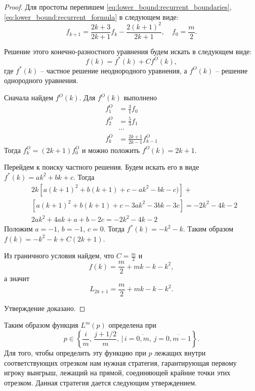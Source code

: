 \begin{proof}
Для простоты перепишем \eqref{eq:lower_bound:recurrent_boundaries}, \eqref{eq:lower_bound:recurrent_formula} в следующем виде:
\begin{equation}
\label{eq:lower_bound:recurrent_formula_simplified}
f_{k+1} = \frac{2k+3}{2k+1} f_k - \frac{2(k+1)^2}{2k+1}, \quad f_0 = \frac{m}{2}.
\end{equation}

Решение этого конечно-разностного уравнения будем искать в следующем виде:
\[
f(k) = f^*(k) + Cf^O(k),
\]
где $ f^*(k) $ -- частное решение неоднородного уравнения, а $ f^O(k) $ -- решение однородного уравнения.

Сначала найдем $ f^O(k) $. Для $ f^O(k) $ выполнено
\begin{align*}
    f^O_1 &= \frac{3}{1} f_0 \\
    f^O_2 &= \frac{5}{3} f_1 \\
    &\cdots \\
    f^O_{k} &= \frac{2k+1}{2k-1} f^O_{k-1}
\end{align*}
Тогда $ f^O_k = (2k+1)f^O_0 $ и можно положить $ f^O(k) = 2k + 1 $. 

Перейдем к поиску частного решения. Будем искать его в виде $ f^*(k) = ak^2 + bk + c $. Тогда
\begin{align*}
    &2k\left[
        a(k+1)^2 + b(k+1) + c - ak^2 - bk - c)
    \right] + \\
    &\left[
        a(k+1)^2 + b(k+1) + c - 3 ak^2 - 3bk - 3c
    \right]
    = -2k^2 - 4k - 2 \\
    &2ak^2 + 4ak + a + b - 2c = -2k^2 - 4k - 2
\end{align*}
Положим $ a = -1, \, b = -1, \, c = 0 $. Тогда $ f^*(k) = -k^2 - k $. 
Таким образом $ f(k) = -k^2 - k + C(2k + 1) $. 

Из граничного условия найдем, что $ C = \frac{m}{2} $ и 
\[
f(k) = \frac{m}{2} + mk - k - k^2,
\]
а значит
\[
L_{2k+1} = \frac{m}{2} + mk - k - k^2.
\]

Утверждение доказано.
\end{proof}

Таким образом функция $ L^m(p) $ определена при
\[ p \in \left\{
    \frac{i}{m}, \, \frac{j+1/2}{m}, \,|\, i = \overline{0, m}, \, j = \overline{0, m-1}
\right\}.
\]
Для того, чтобы определить эту функцию при $ p $ лежащих внутри соответствующих отрезком нам нужная стратегия, гарантирующая первому игроку выигрыш, лежащий на прямой, соединяющей крайние точки этих отрезком. Данная стратегия дается следующим утверждением.

